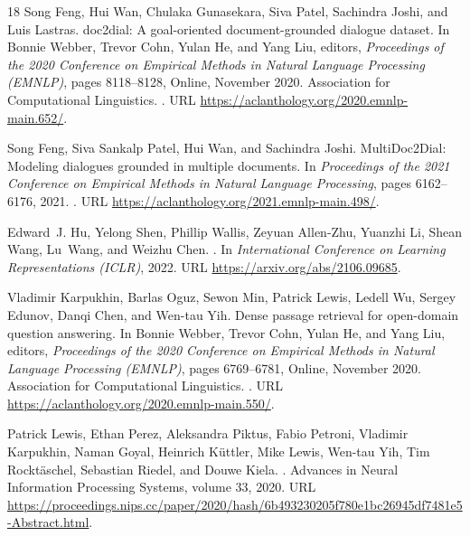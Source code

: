\begin{thebibliography}{18}
Song Feng, Hui Wan, Chulaka Gunasekara, Siva Patel, Sachindra Joshi, and Luis
  Lastras.
\newblock doc2dial: A goal-oriented document-grounded dialogue dataset.
\newblock In Bonnie Webber, Trevor Cohn, Yulan He, and Yang Liu, editors,
  \emph{Proceedings of the 2020 Conference on Empirical Methods in Natural
  Language Processing (EMNLP)}, pages 8118--8128, Online, November 2020.
  Association for Computational Linguistics.
\newblock {}.
\newblock URL \url{https://aclanthology.org/2020.emnlp-main.652/}.

Song Feng, Siva Sankalp Patel, Hui Wan, and Sachindra Joshi.
\newblock MultiDoc2Dial: Modeling dialogues grounded in multiple documents.
\newblock In \emph{Proceedings of the 2021 Conference on Empirical Methods in Natural Language Processing}, pages 6162--6176, 2021.
\newblock {}.
\newblock URL \url{https://aclanthology.org/2021.emnlp-main.498/}.

Edward~J. Hu, Yelong Shen, Phillip Wallis, Zeyuan Allen-Zhu, Yuanzhi Li, Shean
  Wang, Lu~Wang, and Weizhu Chen.
.
\newblock In \emph{International Conference on Learning Representations (ICLR)}, 2022.
\newblock URL \url{https://arxiv.org/abs/2106.09685}.

Vladimir Karpukhin, Barlas Oguz, Sewon Min, Patrick Lewis, Ledell Wu, Sergey
  Edunov, Danqi Chen, and Wen-tau Yih.
\newblock Dense passage retrieval for open-domain question answering.
\newblock In Bonnie Webber, Trevor Cohn, Yulan He, and Yang Liu, editors,
  \emph{Proceedings of the 2020 Conference on Empirical Methods in Natural
  Language Processing (EMNLP)}, pages 6769--6781, Online, November 2020.
  Association for Computational Linguistics.
\newblock {}.
\newblock URL \url{https://aclanthology.org/2020.emnlp-main.550/}.

Patrick Lewis, Ethan Perez, Aleksandra Piktus, Fabio Petroni, Vladimir
  Karpukhin, Naman Goyal, Heinrich K{\"u}ttler, Mike Lewis, Wen-tau Yih, Tim
  Rockt{\"a}schel, Sebastian Riedel, and Douwe Kiela.
.
\newblock Advances in Neural Information Processing Systems, volume 33, 2020.
\newblock URL
  \url{https://proceedings.nips.cc/paper/2020/hash/6b493230205f780e1bc26945df7481e5-Abstract.html}.


\end{thebibliography}
